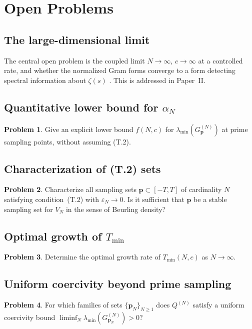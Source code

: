 \documentclass[12pt,a4paper]{amsart}
\theoremstyle{definition}
\newtheorem{problem}{Problem}[section]
\newcommand{\GVM}{G^{(N)}_{\mathbf{p}}}
\newcommand{\AM}{\alpha_N}
\newcommand{\QM}{Q^{(N)}}
\newcommand{\Tmin}{T_{\min}}
\begin{document}
\section{Open Problems}\label{sec:open}

\subsection{The large-dimensional limit}
The central open problem is the coupled limit $N\to\infty$,
$c\to\infty$ at a controlled rate, and whether the normalized
Gram forms converge to a form detecting spectral information
about $\zeta(s)$ \cite{CCM2025}. This is addressed in Paper~II.

\subsection{Quantitative lower bound for $\AM$}
\begin{problem}\label{prob:alpha}
Give an explicit lower bound $f(N,c)$ for $\lambda_{\min}(\GVM)$
at prime sampling points, without assuming (T.2).
\end{problem}

\subsection{Characterization of (T.2) sets}
\begin{problem}\label{prob:T2}
Characterize all sampling sets $\mathbf{p}\subset[-T,T]$ of cardinality
$N$ satisfying condition~(T.2) with $\varepsilon_N\to0$.
Is it sufficient that $\mathbf{p}$ be a stable sampling set for $V_N$
in the sense of Beurling density?
\end{problem}

\subsection{Optimal growth of $\Tmin$}
\begin{problem}
Determine the optimal growth rate of $\Tmin(N,c)$ as $N\to\infty$.
\end{problem}

\subsection{Uniform coercivity beyond prime sampling}
\begin{problem}
For which families of sets $\{\mathbf{p}_N\}_{N\geq1}$ does $\QM$
satisfy a uniform coercivity bound
$\liminf_{N}\lambda_{\min}(G^{(N)}_{\mathbf{p}_N})>0$?
\end{problem}
\end{document}
